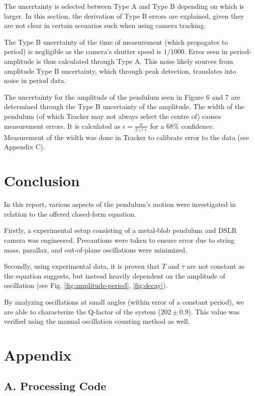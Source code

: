 \documentclass[prl,twocolumn,amsmath,amssymb,superscriptaddress]{revtex4-2}
\begin{document}
The uncertainty is selected between Type A and Type B depending on which is larger. In this section, the derivation of Type B errors are explained, given they are not clear in certain scenarios such when using camera tracking.

The Type B uncertainty of the time of measurement (which propagates to period) is negligible as the camera's shutter speed is $1/1000$. Error seen in period-amplitude is thus calculated through Type A. This noise likely sources from amplitude Type B uncertainty, which through peak detection, translates into noise in period data.

The uncertainty for the amplitude of the pendulum seen in Figure 6 and 7 are determined through the Type B uncertainty of the amplitude. The width of the pendulum (of which Tracker may not always select the centre of) causes measurement errors. It is calculated as $\epsilon = \frac{w}{2(l)}$ for a 68\% confidence. Measurement of the width was done in Tracker to calibrate error to the data (see Appendix C).

\section{Conclusion}
In this report, various aspects of the pendulum's motion were investigated in relation to the offered closed-form equation.

Firstly, a experimental setup consisting of a metal-blob pendulum and DSLR camera was engineered. Precautions were taken to ensure error due to string mass, parallax, and out-of-plane oscillations were minimized.

Secondly, using experimental data, it is proven that $T$ and $\tau$ are not constant as the equation suggests, but instead heavily dependent on the amplitude of oscillation (see Fig. \ref{fig:amplitude-period}, \ref{fig:decay}).

By analyzing oscillations at small angles (within error of a constant period), we are able to characterize the Q-factor of the system ($202\pm0.9$). This value was verified using the manual oscillation counting method as well.


\onecolumngrid

\newpage
\section{Appendix}

\subsection{A. Processing Code}
\end{document}
